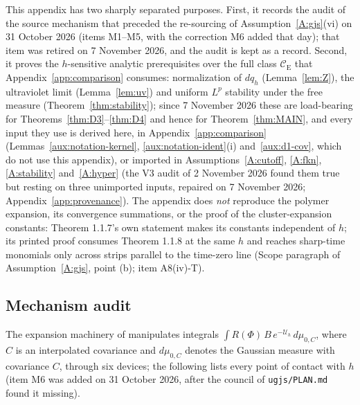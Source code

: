 \documentclass[11pt,a4paper]{article}
\theoremstyle{plain}
\theoremstyle{definition}
\theoremstyle{plain}
\theoremstyle{definition}
\newcommand{\CE}{\mathcal{C}_{\mathrm E}}
\begin{document}
This appendix has two sharply separated purposes.  First, it records the audit of the
source mechanism that preceded the re-sourcing of Assumption~\ref{A:gjs}(vi) on
31 October 2026 (items M1--M5, with the correction M6 added that day); that item was
retired on 7 November 2026, and the audit is kept as a record.  Second, it proves
the $h$-sensitive analytic prerequisites over the full class $\CE$ that
Appendix~\ref{app:comparison} consumes: normalization of $dq_h$ (Lemma~\ref{lem:Z}), the
ultraviolet limit (Lemma~\ref{lem:uv}) and uniform $L^p$ stability under the free measure
(Theorem~\ref{thm:stability}); since 7 November 2026 these are load-bearing for
Theorems~\ref{thm:D3}--\ref{thm:D4} and hence for Theorem~\ref{thm:MAIN}, and every input
they use is derived here, in Appendix~\ref{app:comparison} (Lemmas~\ref{aux:notation-kernel},
\ref{aux:notation-ident}(i) and~\ref{aux:d1-cov}, which do not use this appendix), or imported
in Assumptions~\ref{A:cutoff}, \ref{A:fkn}, \ref{A:stability} and~\ref{A:hyper} (the V3 audit of 2 November 2026 found them true but resting on three
unimported inputs, repaired on 7 November 2026; Appendix~\ref{app:provenance}).  The
appendix does \emph{not} reproduce the polymer expansion, its convergence summations, or
the proof of the cluster-expansion constants: Theorem 1.1.7's own statement makes its
constants independent of $h$; its printed proof consumes Theorem 1.1.8 at the same $h$ and
reaches sharp-time monomials only across strips parallel to the time-zero line (Scope
paragraph of Assumption~\ref{A:gjs}, point (b); item A8(iv)-T).

\subsection*{Mechanism audit}

The expansion machinery of \cite[\S\S2--4]{GJS} manipulates integrals
$\int R(\Phi)\,B\,e^{-\mathcal U_h}\,d\mu_{0,C}$, where $C$ is an interpolated
covariance and $d\mu_{0,C}$ denotes the Gaussian measure with covariance $C$, through
six devices; the following lists every point of contact with $h$ (item M6 was added on
31 October 2026, after the council of \texttt{ugjs/PLAN.md} found it missing).
\end{document}
